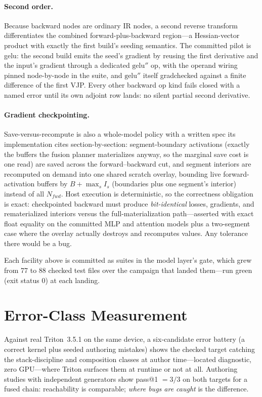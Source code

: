 \documentclass[11pt]{article}
\begin{document}
\paragraph{Second order.} Because backward nodes are ordinary IR nodes, a
second reverse transform differentiates the combined
forward-plus-backward region---a Hessian-vector product with exactly the
first build's seeding semantics. The committed pilot is gelu: the second
build emits the seed's gradient by reusing the first derivative and the
input's gradient through a dedicated $\mathrm{gelu}''$ op, with the
operand wiring pinned node-by-node in the suite, and $\mathrm{gelu}''$
itself gradchecked against a finite difference of the first VJP. Every
other backward op kind fails closed with a named error until its own
adjoint row lands: no silent partial second derivative.

\paragraph{Gradient checkpointing.} Save-versus-recompute is also a
whole-model policy with a written spec its implementation cites
section-by-section: segment-boundary activations (exactly the buffers the
fusion planner materializes anyway, so the marginal save cost is one
read) are saved across the forward--backward cut, and segment interiors
are recomputed on demand into one shared scratch overlay, bounding live
forward-activation buffers by $B + \max_s I_s$ (boundaries plus one
segment's interior) instead of all $N_{fwd}$. Host execution is
deterministic, so the correctness obligation is exact: checkpointed
backward must produce \emph{bit-identical} losses, gradients, and
rematerialized interiors versus the full-materialization path---asserted
with exact float equality on the committed MLP and attention models plus
a two-segment case where the overlay actually destroys and recomputes
values. Any tolerance there would be a bug.

Each facility above is committed as suites in the model layer's gate,
which grew from 77 to 88 checked test files over the campaign that landed
them---run green (exit status 0) at each landing.

\section{Error-Class Measurement}\label{sec:errors}
Against real Triton~3.5.1 on the same device, a six-candidate error
battery (a correct kernel plus seeded authoring mistakes) shows the
checked target catching the stack-discipline and composition classes at
author time---located diagnostic, zero GPU---where Triton surfaces them
at runtime or not at all. Authoring studies with independent generators
show pass@1 $=3/3$ on both targets for a fused chain: reachability is
comparable; \emph{where bugs are caught} is the difference.
\end{document}
